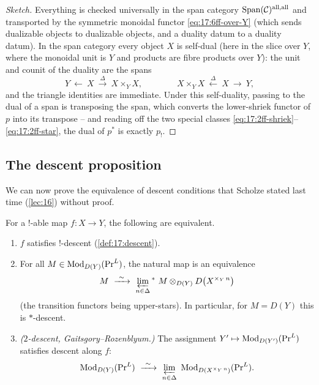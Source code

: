 \begin{proof}[Sketch]
Everything is checked universally in the span category $\operatorname{Span}(\mathcal C)^{\mathrm{all},\mathrm{all}}$
and transported by the symmetric monoidal functor \eqref{eq:17:6ff-over-Y} (which sends
dualizable objects to dualizable objects, and a duality datum to a duality datum). In the span
category every object $X$ is self-dual (here in the slice over $Y$, where the monoidal unit
is $Y$ and products are fibre products over $Y$): the unit and counit of the duality are the
spans
\[
Y\ \leftarrow\ X\ \xrightarrow{\ \Delta\ }\ X\times_{Y}X,\qquad\qquad
X\times_{Y}X\ \xleftarrow{\ \Delta\ }\ X\ \rightarrow\ Y,
\]
and the triangle identities are immediate. Under this self-duality, passing to
the dual of a span is transposing the span, which converts the lower-shriek functor of
$p$ into its transpose -- and reading off the two special classes
\eqref{eq:17:2ff-shriek}--\eqref{eq:17:2ff-star}, the dual of $p^{*}$ is exactly $p_{!}$.
\end{proof}

\subsection{The descent proposition}
\label{subsec:17:proposition}

We can now prove the equivalence of descent conditions that Scholze stated last time
(\cref{lec:16}) without proof.

\begin{proposition}
\label{prop:17:descent-tfae}
For a $!$-able map $f\colon X\to Y$, the following are equivalent.
\begin{enumerate}
\item $f$ satisfies $!$-descent (\cref{def:17:descent}).
\item For all $M\in\operatorname{Mod}_{D(Y)}(\mathrm{Pr}^{L})$, the natural map is an equivalence
\begin{equation*}
M\ \xrightarrow{\ \sim\ }\ \varprojlim_{n\in\Delta}{}^{*}\ M\otimes_{D(Y)}D\bigl(X^{\times_{Y}\,n}\bigr)
\end{equation*}
(the transition functors being upper-stars). In particular, for $M=D(Y)$ this is $*$-descent.
\item \emph{($2$-descent, Gaitsgory--Rozenblyum.)} The assignment $Y'\mapsto\operatorname{Mod}_{D(Y')}(\mathrm{Pr}^{L})$
satisfies descent along $f$:
\begin{equation*}
\Mod_{D(Y)}(\PrL)\ \xrightarrow{\ \sim\ }\ \varprojlim_{n\in\Delta}\ \Mod_{D(X^{\times_{Y}\,n})}(\PrL).
\end{equation*}
\end{enumerate}
\end{proposition}

